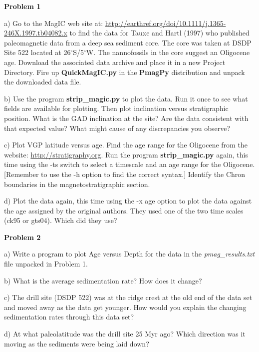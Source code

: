 {\parindent 0pt  \parskip 6pt

{\bf Problem 1 }

a) Go to the MagIC web site at: \url{http://earthref.org/doi/10.1111/j.1365-246X.1997.tb04082.x} to find the data for Tauxe and Hartl (1997) \nocite{tauxe97} who published paleomagnetic data from a deep sea sediment core.   The core was taken at DSDP Site 522 located at  26$^{\circ}$S/5$^{\circ}$W.  The nannofossils in the core suggest an Oligocene age.   Download the associated data  archive and place it in a new Project Directory.  Fire up {\bf QuickMagIC.py} in the {\bf PmagPy} distribution and unpack the   downloaded data file.   


b) Use the program {\bf strip\_magic.py} to plot the data.  Run it once to see what fields are  available for plotting.  Then plot inclination versus stratigraphic position.  
 What is the GAD inclination at the site?    Are the data consistent with that expected value?   What might cause of any discrepancies you observe?    

c) Plot VGP latitude versus age.  
 Find the age range for the Oligocene from the website: \url{http://stratigraphy.org}.  Run the program {\bf strip\_magic.py} again, this time using the -ts switch to select a timescale and an age range for the Oligocene. [Remember to use the -h option to find the correct syntax.]     Identify the Chron boundaries in the magnetostratigraphic section.   

d) Plot the data again, this time using the -x age option to plot the data against the age assigned by the original authors.   They used one of the two time scales (ck95 or gts04).  Which did they use?  

{\bf Problem 2}

a) Write a program to plot Age versus Depth for the data in the {\it pmag\_results.txt} file unpacked  in Problem 1.  

b) What is the average sedimentation rate?  How does it change? 

c) The drill site (DSDP 522) was at the ridge crest  at the old end of the data set and moved away as the data get younger.  How would you explain the changing sedimentation rates through this data set? 

d) At what paleolatitude was the drill site 25 Myr ago?  Which direction was it moving as the sediments were being laid down?  


}

